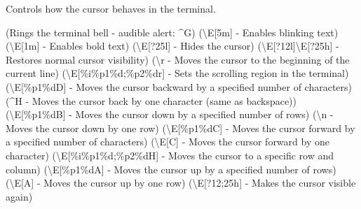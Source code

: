 \begin{NxSSBox}
	\begin{NxIDBox}
		Controls how the cursor behaves in the terminal.
		\begin{NxListDark}
			 (Rings the terminal bell - audible alert: \textasciicircum G)
			 (\textbackslash E[5m] - Enables blinking text)
			 (\textbackslash E[1m] - Enables bold text)
			 (\textbackslash E[?25l] - Hides the cursor)
			 (\textbackslash E[?12l]\textbackslash E[?25h] - Restores normal cursor visibility)
			 (\textbackslash r - Moves the cursor to the beginning of the current line)
			 (\textbackslash E[\%i\%p1\%d;\%p2\%dr] - Sets the scrolling region in the terminal)
			 (\textbackslash E[\%p1\%dD] - Moves the cursor backward by a specified number of characters)
			 (\textasciicircum H - Moves the cursor back by one character (same as backspace))
			 (\textbackslash E[\%p1\%dB] - Moves the cursor down by a specified number of rows)
			 (\textbackslash n - Moves the cursor down by one row)
			 (\textbackslash E[\%p1\%dC] - Moves the cursor forward by a specified number of characters)
			 (\textbackslash E[C] - Moves the cursor forward by one character)
			 (\textbackslash E[\%i\%p1\%d;\%p2\%dH] - Moves the cursor to a specific row and column)
			 (\textbackslash E[\%p1\%dA] - Moves the cursor up by a specified number of rows)
			 (\textbackslash E[A] - Moves the cursor up by one row)
			 (\textbackslash E[?12;25h] - Makes the cursor visible again)
		\end{NxListDark}
	\end{NxIDBox}
\end{NxSSBox}

